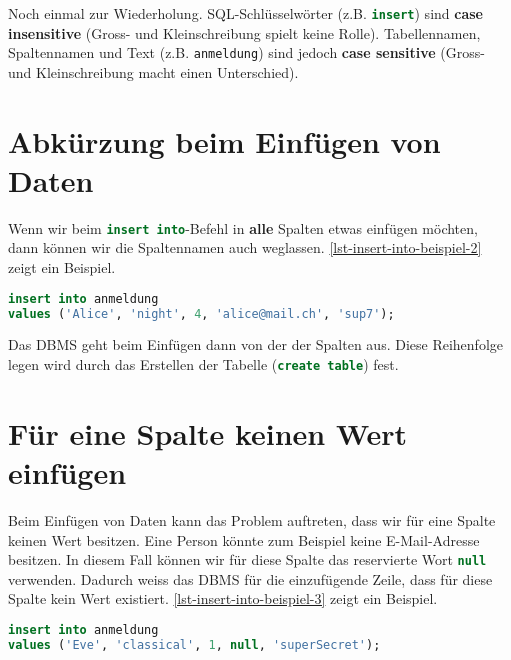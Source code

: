 \begin{important}
Noch einmal zur Wiederholung. \ac{SQL}-Schlüsselwörter (z.B. \lstinline[language=sql]{insert}) sind \textbf{case insensitive} (Gross- und Kleinschreibung spielt keine Rolle). Tabellennamen, Spaltennamen und Text (z.B. \lstinline{anmeldung}) sind jedoch \textbf{case sensitive} (Gross- und Kleinschreibung macht einen Unterschied).
\end{important}

\section{Abkürzung beim Einfügen von Daten}

Wenn wir beim \lstinline[language=sql]{insert into}-Befehl in \textbf{alle} Spalten etwas einfügen möchten, dann können wir die Spaltennamen auch weglassen. \autoref{lst-insert-into-beispiel-2} zeigt ein Beispiel.

\begin{lstlisting}[language=SQL, upquote=true, morekeywords={real, text}, caption={Einfügen ohne Spaltennamen.}, label	={lst-insert-into-beispiel-2}]
insert into anmeldung 
values ('Alice', 'night', 4, 'alice@mail.ch', 'sup7');
\end{lstlisting}

Das \ac{DBMS} geht beim Einfügen dann von der  der Spalten aus. Diese Reihenfolge legen wird durch das Erstellen der Tabelle (\lstinline[language=sql]{create table}) fest.  

\section{Für eine Spalte keinen Wert einfügen}

Beim Einfügen von Daten kann das Problem auftreten, dass wir für eine Spalte keinen Wert besitzen. Eine Person könnte zum Beispiel keine E-Mail-Adresse besitzen. In diesem Fall können wir für diese Spalte das reservierte Wort \lstinline[language=sql]{null} verwenden. Dadurch weiss das \ac{DBMS} für die einzufügende Zeile, dass für diese Spalte kein Wert existiert. \autoref{lst-insert-into-beispiel-3} zeigt ein Beispiel.

\begin{lstlisting}[language=SQL, upquote=true, morekeywords={real, text}, caption={Eve besitzt keine E-Mail-Adresse.}, label	={lst-insert-into-beispiel-3}]
insert into anmeldung 
values ('Eve', 'classical', 1, null, 'superSecret');
\end{lstlisting}

